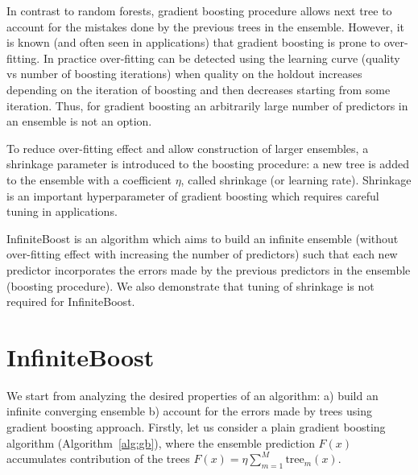 In contrast to random forests, gradient boosting procedure allows next tree to account for the mistakes done by the previous trees in the ensemble.
However, it is known (and often seen in applications) that gradient boosting is prone to over-fitting.
In practice over-fitting can be detected using the learning curve (quality vs number of boosting iterations) when quality on the holdout increases depending on the iteration of boosting and then decreases starting from some iteration. 
Thus, for gradient boosting an arbitrarily large number of predictors in an ensemble is not an option. 


To reduce over-fitting effect and allow construction of larger ensembles, a shrinkage parameter is introduced to the boosting procedure: a new tree is added to the ensemble with a coefficient $\eta$, called shrinkage (or learning rate).
Shrinkage is an important hyperparameter of gradient boosting which requires careful tuning in applications.

InfiniteBoost is an algorithm which aims to build an infinite ensemble (without over-fitting effect with increasing the number of predictors) such that each new predictor incorporates the errors made by the previous predictors in the ensemble (boosting procedure).
We also demonstrate that tuning of shrinkage is not required for InfiniteBoost. 

\section{InfiniteBoost}

We start from analyzing the desired properties of an algorithm:
a) build an infinite converging ensemble 
b) account for the errors made by trees using gradient boosting approach.
Firstly, let us consider a plain gradient boosting algorithm (Algorithm~\ref{alg:gb}),
where the ensemble prediction $F(x)$ accumulates contribution of the trees $ F(x) = \eta \sum_{m=1}^M \text{tree}_m(x) $.

